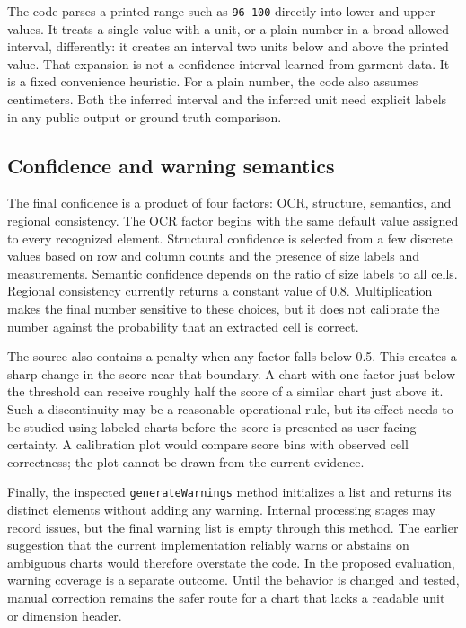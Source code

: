 \documentclass[10pt,letterpaper]{article}
\begin{document}
The code parses a printed range such as \texttt{96-100} directly into lower and upper values. It treats a single value with a unit, or a plain number in a broad allowed interval, differently: it creates an interval two units below and above the printed value. That expansion is not a confidence interval learned from garment data. It is a fixed convenience heuristic. For a plain number, the code also assumes centimeters. Both the inferred interval and the inferred unit need explicit labels in any public output or ground-truth comparison.

\subsection{Confidence and warning semantics}

The final confidence is a product of four factors: OCR, structure, semantics, and regional consistency. The OCR factor begins with the same default value assigned to every recognized element. Structural confidence is selected from a few discrete values based on row and column counts and the presence of size labels and measurements. Semantic confidence depends on the ratio of size labels to all cells. Regional consistency currently returns a constant value of 0.8. Multiplication makes the final number sensitive to these choices, but it does not calibrate the number against the probability that an extracted cell is correct.

The source also contains a penalty when any factor falls below 0.5. This creates a sharp change in the score near that boundary. A chart with one factor just below the threshold can receive roughly half the score of a similar chart just above it. Such a discontinuity may be a reasonable operational rule, but its effect needs to be studied using labeled charts before the score is presented as user-facing certainty. A calibration plot would compare score bins with observed cell correctness; the plot cannot be drawn from the current evidence.

Finally, the inspected \texttt{generateWarnings} method initializes a list and returns its distinct elements without adding any warning. Internal processing stages may record issues, but the final warning list is empty through this method. The earlier suggestion that the current implementation reliably warns or abstains on ambiguous charts would therefore overstate the code. In the proposed evaluation, warning coverage is a separate outcome. Until the behavior is changed and tested, manual correction remains the safer route for a chart that lacks a readable unit or dimension header.
\end{document}
